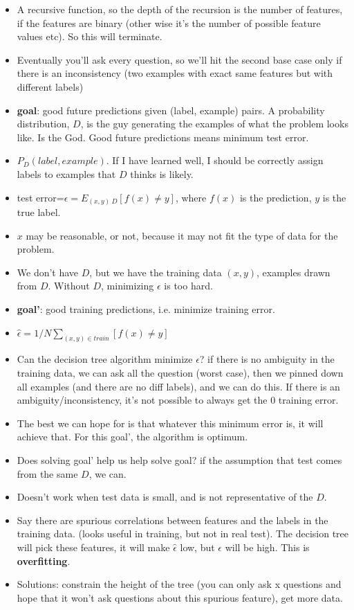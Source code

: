 \begin{itemize}
\item A recursive function, so the depth of the recursion is the number
  of features, if the features are binary (other wise it's the number
  of possible feature values etc). So this will terminate.
\item Eventually you'll ask every question, so we'll hit the second
  base case only if there is an inconsistency (two examples with exact
  same features but with different labels)
\item \textbf{goal}: good future predictions given (label, example)
  pairs. A probability distribution, $D$, is the guy generating the
  examples of what the problem looks like. Is the God. Good future
  predictions means minimum test error.

\item $P_D(label, example)$. If I have learned well, I
  should be correctly assign labels to examples that $D$ thinks is likely.
\item test error=$\epsilon = E_{(x,y)~D}[f(x) \neq y]$, where $f(x)$
  is the prediction, $y$ is the true label.

\item $x$ may be reasonable, or not, because it may not fit the type
  of data for the problem.
\item We don't have $D$, but we have the training data $(x,y)$,
  examples drawn from $D$. Without $D$, minimizing $\epsilon$ is too hard.
\item \textbf{goal'}: good training predictions, i.e. minimize
  training error.
\item  $\hat{\epsilon} = 1/N \sum_{(x,y)\in train}[f(x)\neq y]$
\item Can the decision tree algorithm minimize $\hat{\epsilon}$? if
  there is no ambiguity in the training data, we can ask all the
  question (worst case), then we pinned down all examples (and there
  are no diff labels), and we can do this. If there is an
  ambiguity/inconsistency,  it's not possible to always get the 0 training error.
\item The best we can hope for is that whatever this minimum error is,
  it will achieve that. For this goal', the algorithm is optimum.
\item Does solving goal' help us help solve goal? if the assumption
  that test comes from the same $D$, we can.
\item Doesn't work when test data is small, and is not representative
  of the $D$.
\item Say there are spurious correlations between features and the labels in the
  training data. (looks useful in training, but not in real
  test). The decision tree will pick these features, it will make
  $\hat{\epsilon}$ low, but $\epsilon$ will be high. This is \textbf{overfitting}.
\item Solutions: constrain the height of the tree (you can only ask x
  questions and hope that it won't ask questions about this spurious feature), get more data.
\end{itemize}

